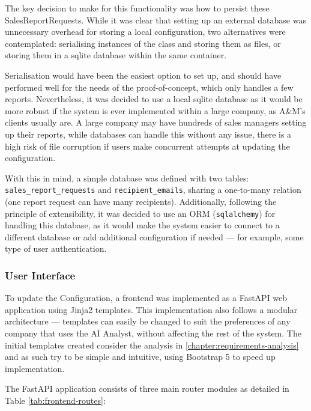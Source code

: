 \documentclass[a4paper]{report}
\begin{document}
The key decision to make for this functionality was how to persist these SalesReportRequests. While it was clear that setting up an external database was unnecessary overhead for storing a local configuration, two alternatives were contemplated: serialising instances of the class and storing them as files, or storing them in a sqlite database within the same container.

Serialisation would have been the easiest option to set up, and should have performed well for the needs of the proof-of-concept, which only handles a few reports. Nevertheless, it was decided to use a local sqlite database as it would be more robust if the system is ever implemented within a large company, as A\&M's clients usually are. A large company may have hundreds of sales managers setting up their reports, while databases can handle this without any issue, there is a high risk of file corruption if users make concurrent attempts at updating the configuration.

With this in mind, a simple database was defined with two tables: \texttt{sales\_report\_requests} and \texttt{recipient\_emails}, sharing a one-to-many relation (one report request can have many recipients). Additionally, following the principle of extensibility, it was decided to use an ORM (\texttt{sqlalchemy}) for handling this database, as it would make the system easier to connect to a different database or add additional configuration if needed --- for example, some type of user authentication.

\subsubsection{User Interface}

To update the Configuration, a frontend was implemented as a FastAPI web application using Jinja2 templates. This implementation also follows a modular architecture --- templates can easily be changed to suit the preferences of any company that uses the AI Analyst, without affecting the rest of the system. The initial templates created consider the analysis in \autoref{chapter:requirements-analysis} and as such try to be simple and intuitive, using Bootstrap 5 to speed up implementation.

The FastAPI application consists of three main router modules as detailed in Table \ref{tab:frontend-routes}:
\end{document}
